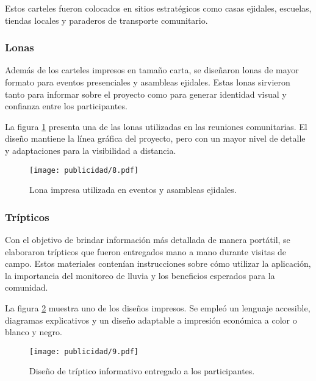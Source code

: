 Estos carteles fueron colocados en sitios estratégicos como casas ejidales, escuelas, tiendas locales y paraderos de transporte comunitario.

\vspace{1em}

\subsubsection{Lonas}

Además de los carteles impresos en tamaño carta, se diseñaron lonas de mayor formato para eventos presenciales y asambleas ejidales. Estas lonas sirvieron tanto para informar sobre el proyecto como para generar identidad visual y confianza entre los participantes.

La figura \ref{fig:lona} presenta una de las lonas utilizadas en las reuniones comunitarias. El diseño mantiene la línea gráfica del proyecto, pero con un mayor nivel de detalle y adaptaciones para la visibilidad a distancia.

\begin{figure}[H]
\centering
  \texttt{[image: publicidad/8.pdf]}
  \caption{Lona impresa utilizada en eventos y asambleas ejidales.}
  \label{fig:lona}
\end{figure}

\vspace{1em}

\subsubsection{Trípticos}

Con el objetivo de brindar información más detallada de manera portátil, se elaboraron trípticos que fueron entregados mano a mano durante visitas de campo. Estos materiales contenían instrucciones sobre cómo utilizar la aplicación, la importancia del monitoreo de lluvia y los beneficios esperados para la comunidad.

La figura \ref{fig:triptico} muestra uno de los diseños impresos. Se empleó un lenguaje accesible, diagramas explicativos y un diseño adaptable a impresión económica a color o blanco y negro.

\begin{figure}[H]
\centering
  \texttt{[image: publicidad/9.pdf]}
  \caption{Diseño de tríptico informativo entregado a los participantes.}
  \label{fig:triptico}
\end{figure}

